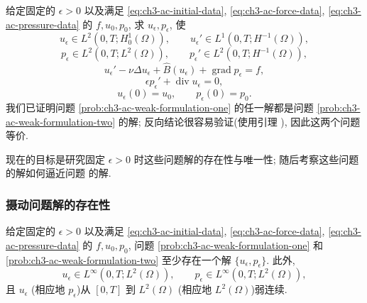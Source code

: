 \MBProblemHeading\label{prob:ch3-ac-weak-formulation-two}
给定固定的 $\epsilon>0$ 以及满足 \eqref{eq:ch3-ac-initial-data}, \eqref{eq:ch3-ac-force-data}, \eqref{eq:ch3-ac-pressure-data} 的 $f,u_0,p_0$, 求 $u_\epsilon,p_\epsilon$, 使
\begin{equation}
u_\epsilon\in L^2(0,T;H_0^1(\Omega)),
\qquad u_\epsilon'\in L^1(0,T;H^{-1}(\Omega)),
\label{eq:ch3-ac-problem-two-velocity-space}
\end{equation}
\begin{equation}
p_\epsilon\in L^2(0,T;L^2(\Omega)),
\qquad p_\epsilon'\in L^2(0,T;H^{-1}(\Omega)),
\label{eq:ch3-ac-problem-two-pressure-space}
\end{equation}
\begin{equation}
u_\epsilon'-\nu\Delta u_\epsilon+\widehat B(u_\epsilon)
+\operatorname{grad}p_\epsilon=f,
\label{eq:ch3-ac-problem-two-momentum}
\end{equation}
\begin{equation}
\epsilon p_\epsilon'+\operatorname{div}u_\epsilon=0,
\label{eq:ch3-ac-problem-two-continuity}
\end{equation}
\begin{equation}
u_\epsilon(0)=u_0,
\qquad p_\epsilon(0)=p_0.
\label{eq:ch3-ac-problem-two-initial}
\end{equation}
我们已证明问题 \ref{prob:ch3-ac-weak-formulation-one} 的任一解都是问题 \ref{prob:ch3-ac-weak-formulation-two} 的解; 反向结论很容易验证(使用引理 ), 因此这两个问题等价.

\hypertarget{chapter-03-page-306}{}
现在的目标是研究固定 $\epsilon>0$ 时这些问题解的存在性与唯一性; 随后考察这些问题的解如何逼近问题  的解.

\subsubsection{摄动问题解的存在性}
\label{subsubsec:ch3-ac-existence}

\begin{Theorem}
\label{thm:ch3-ac-existence}
给定固定的 $\epsilon>0$ 以及满足 \eqref{eq:ch3-ac-initial-data}, \eqref{eq:ch3-ac-force-data}, \eqref{eq:ch3-ac-pressure-data} 的 $f,u_0,p_0$, 问题 \ref{prob:ch3-ac-weak-formulation-one} 和 \ref{prob:ch3-ac-weak-formulation-two} 至少存在一个解 $\{u_\epsilon,p_\epsilon\}$. 此外,
\begin{equation}
u_\epsilon\in L^\infty(0,T;L^2(\Omega)),
\qquad p_\epsilon\in L^\infty(0,T;L^2(\Omega)),
\label{eq:ch3-ac-existence-linfty}
\end{equation}
且 $u_\epsilon$ (相应地 $p_\epsilon$)从 $[0,T]$ 到 $L^2(\Omega)$ (相应地 $L^2(\Omega)$)弱连续.
\end{Theorem}

